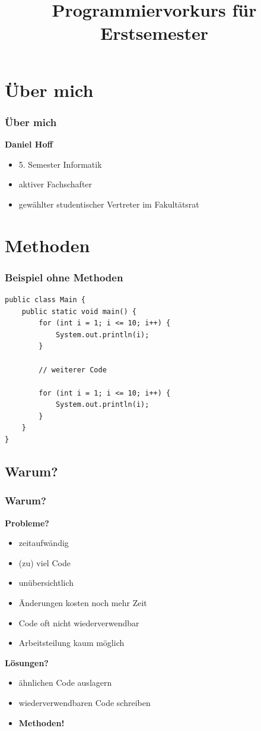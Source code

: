 \documentclass[final]{beamer}
\title{Programmiervorkurs für Erstsemester}
\begin{document}
\lstset{tabsize=4}
\lstset{basicstyle=\small}
\lstset{language=java}

\begin{frame}
  \titlepage
\end{frame}

\section{Über mich}
\begin{frame}
	\frametitle{Über mich}
	\textbf{Daniel Hoff}
	\begin{itemize}
		\item{5. Semester Informatik}
		\item{aktiver Fachschafter}
		\item{gewählter studentischer Vertreter im Fakultätsrat}
	\end{itemize}
\end{frame}

\section{Methoden}
\begin{frame}[containsverbatim]
	\frametitle{Beispiel ohne Methoden}
	\begin{lstlisting}
public class Main {
	public static void main() {
		for (int i = 1; i <= 10; i++) {
			System.out.println(i);
		}
		
		// weiterer Code
		
		for (int i = 1; i <= 10; i++) {
			System.out.println(i);
		}
	}
}
	\end{lstlisting}
\end{frame}

\subsection{Warum?}
\begin{frame}
	\frametitle{Warum?}
	\textbf{Probleme?}
	\begin{itemize}
		\item{zeitaufwändig}
		\item{(zu) viel Code}
		\item{unübersichtlich}
		\item{Änderungen kosten noch mehr Zeit}
		\item{Code oft nicht wiederverwendbar}
		\item{Arbeitsteilung kaum möglich}
	\end{itemize}
	\pause
	\vspace{\baselineskip}
	\textbf{Lösungen?}
	\pause
	\begin{itemize}
		\item{ähnlichen Code auslagern}
		\item{wiederverwendbaren Code schreiben}
		\item{\textbf{Methoden!}}
	\end{itemize}
\end{frame}
\end{document}
